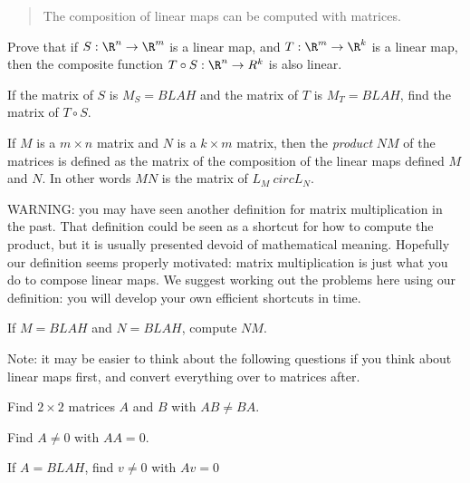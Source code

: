 \documentclass{article}
\begin{document}
\begin{abstract}
  The composition of linear maps can be computed with matrices.
\end{abstract}

\begin{question}
  Prove that if $S:\R^n \to \R^m$ is a linear map, and $T:\R^m \to \R^k$ is a linear map, then the composite function $T\circ S:\R^n \to R^k$ is also linear.
\end{question}

\begin{question}
  If the matrix of $S$ is $M_S = BLAH$ and the matrix of $T$ is $M_T = BLAH$, find the matrix of $T \circ S$.
\end{question}


\begin{definition}
  If $M$ is a $m\times n$ matrix and $N$ is a $k \times m$ matrix, then the \textit{product} $NM$ of the matrices is
  defined as the matrix of the composition of the linear maps defined $M$ and $N$.  In other words  $MN$ is the matrix of 
  $L_M\ circ L_N$.
\end{definition}

WARNING:  you may have seen another definition for matrix multiplication in the past.  That definition could be seen as a shortcut for how
to compute the product, but it is usually presented devoid of mathematical meaning.  Hopefully our definition seems properly motivated:  matrix multiplication is 
just what you do to compose linear maps.  We suggest working out the problems here using our definition:  you will develop your own efficient shortcuts in time.

\begin{question}
  If $M = BLAH$ and $N=BLAH$, compute $NM$.
\end{question}

Note:  it may be easier to think about the following questions if you think about linear maps first, and convert everything over to matrices after.

\begin{question}
  Find $2\times 2$ matrices $A$ and $B$ with $AB \neq BA$.
\end{question}

\begin{question}
  Find $A \neq 0$  with $AA = 0$.
\end{question}

\begin{question}
  If $A = BLAH$, find $v \neq 0$ with $Av = 0$ 
\end{question}
\end{document}
